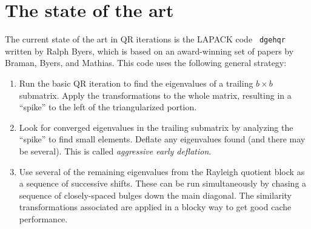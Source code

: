 \section{The state of the art}

The current state of the art in QR iterations is the LAPACK code {\tt
  dgehqr} written by Ralph Byers, which is based on an award-winning
set of papers by Braman, Byers, and Mathias.  This code uses the following
general strategy:
\begin{enumerate}
\item
  Run the basic QR iteration to find the eigenvalues of a trailing $b \times b$
  submatrix.  Apply the transformations to the whole matrix, resulting in
  a ``spike'' to the left of the triangularized portion.
\item
  Look for converged eigenvalues in the trailing submatrix by analyzing
  the ``spike'' to find small elements.  Deflate any eigenvalues found
  (and there may be several).  This is called {\em aggressive early deflation}.
\item
  Use several of the remaining eigenvalues from the Rayleigh quotient block
  as a sequence of successive shifts.  These can be run simultaneously by
  chasing a sequence of closely-spaced bulges down the main diagonal.
  The similarity transformations associated are applied in a blocky way
  to get good cache performance.
\end{enumerate}
